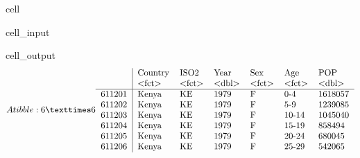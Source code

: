 \documentclass[letterpaper,10pt,english]{jupyterBook}
\begin{document}
\begin{sphinxuseclass}{cell}\begin{sphinxVerbatimInput}

\begin{sphinxuseclass}{cell_input}
\begin{sphinxVerbatim}[commandchars=\\\{\}]
\end{sphinxVerbatim}

\end{sphinxuseclass}\end{sphinxVerbatimInput}
\begin{sphinxVerbatimOutput}

\begin{sphinxuseclass}{cell_output}\begin{equation*}
\begin{split}A tibble: 6 × 6
\begin{tabular}{r|llllll}
  & Country & ISO2 & Year & Sex & Age & POP\\
  & <fct> & <fct> & <dbl> & <fct> & <fct> & <dbl>\\
\hline
	611201 & Kenya & KE & 1979 & F & 0-4   & 1618057\\
	611202 & Kenya & KE & 1979 & F & 5-9   & 1239085\\
	611203 & Kenya & KE & 1979 & F & 10-14 & 1045040\\
	611204 & Kenya & KE & 1979 & F & 15-19 &  858494\\
	611205 & Kenya & KE & 1979 & F & 20-24 &  680045\\
	611206 & Kenya & KE & 1979 & F & 25-29 &  542065\\
\end{tabular}\end{split}
\end{equation*}
\end{sphinxuseclass}\end{sphinxVerbatimOutput}

\end{sphinxuseclass}
\end{document}
